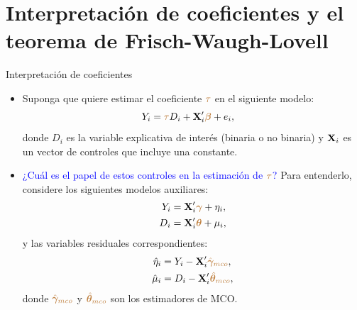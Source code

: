 \documentclass[9pt, xcolor=dvipsnames]{beamer}
\begin{document}
\section{Interpretación de coeficientes y el teorema de Frisch-Waugh-Lovell}

\begin{frame}{Interpretación de coeficientes}
\begin{itemize}
    \item Suponga que quiere estimar el coeficiente \(\textcolor{brown}{\tau}\) en el siguiente modelo:
    \begin{align}
        Y_i &= \textcolor{brown}{\tau} D_i + \textbf{X}'_i\textcolor{brown}{\boldsymbol{\beta}} + e_i,
    \end{align}
    donde \(D_i\) es la variable explicativa de interés (binaria o no binaria) y \(\textbf{X}_i\) es un vector de controles que incluye una constante.
    \vspace{1em}
    \item \textcolor{blue}{¿Cuál es el papel de estos controles en la estimación de \(\textcolor{brown}{\tau}\)?}
    Para entenderlo, considere los siguientes modelos auxiliares:
    \begin{align}
        Y_i &= \textbf{X}'_i\textcolor{brown}{\boldsymbol{\gamma}} + \eta_i, \\
        D_i &= \textbf{X}'_i\textcolor{brown}{\boldsymbol{\theta}} + \mu_i,
    \end{align}
    y las variables residuales correspondientes:
    \begin{align*}
        \hat{\eta}_i &= Y_i - \textbf{X}'_i \textcolor{brown}{\hat{\boldsymbol{\gamma}}_{mco}}, \\
        \hat{\mu}_i &= D_i - \textbf{X}'_i \textcolor{brown}{\hat{\boldsymbol{\theta}}_{mco}},
    \end{align*}
    donde \(\textcolor{brown}{\hat{\boldsymbol{\gamma}}_{mco}}\) y \(\textcolor{brown}{\hat{\boldsymbol{\theta}}_{mco}}\) son los estimadores de MCO.
\end{itemize}    
\end{frame}
\end{document}
